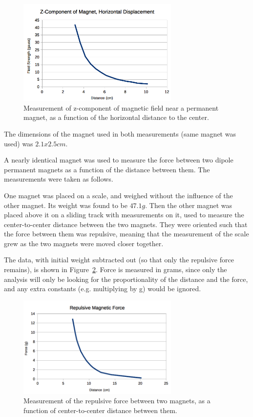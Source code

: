 \documentclass[journal]{IEEEtran}
\begin{document}
\begin{figure}[ht!]
\centering
\includegraphics[width=80mm]{maghall_horiz.png}
\caption{Measurement of z-component of magnetic field near a permanent magnet,
as a function of the horizontal distance to the center.}
\label{fig:maghall_horiz}
\end{figure}

The dimensions of the magnet used in both measurements (same magnet was used)
was $2.1x2.5 cm$.

A nearly identical magnet was used to measure the force between two dipole
permanent magnets as a function of the distance between them. The measurements
were taken as follows.

One magnet was placed on a scale, and weighed without the influence of the
other magnet. Its weight was found to be $47.1 g$. Then the other magnet was
placed above it on a sliding track with measurements on it, used to measure the
center-to-center distance between the two magnets. They were oriented such that
the force between them was repulsive, meaning that the measurement of the scale
grew as the two magnets were moved closer together.

The data, with initial weight subtracted out (so that only the repulsive force
remains), is shown in Figure~\ref{fig:magforce}. Force is measured in
grams, since only the analysis will only be looking for the proportionality of
the distance and the force, and any extra constants (e.g. multiplying by g)
would be ignored.

\begin{figure}[ht!]
\centering
\includegraphics[width=80mm]{magforce.png}
\caption{Measurement of the repulsive force between two magnets, as a function
of center-to-center distance between them.}
\label{fig:magforce}
\end{figure}
\end{document}
